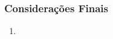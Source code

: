 \documentclass[12pt, compress, usetitleprogressbar]{beamer}\usepackage[]{graphicx}\usepackage[]{color}
\begin{document}

















\begin{frame}

\frametitle{Considerações Finais}

\begin{enumerate}[label=$\bullet$, leftmargin=*]

  \item 

\end{enumerate}

\end{frame}

\end{document}
